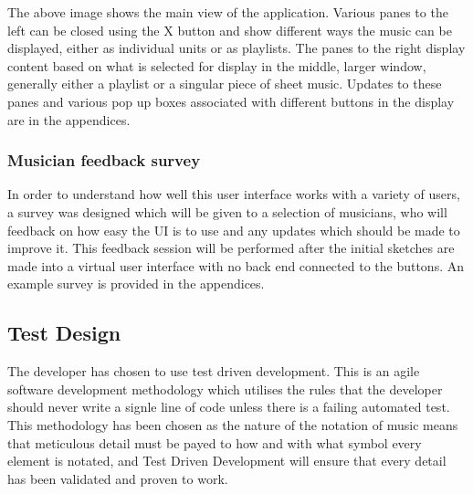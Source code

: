 \documentclass[bibtotocnumbered]{article}
\begin{document}
The above image shows the main view of the application. Various panes to the left can be closed using the X button and show different ways the music can be displayed, either as individual units or as playlists. The panes to the right display content based on what is selected for display in the middle, larger window, generally either a playlist or a singular piece of sheet music. Updates to these panes and various pop up boxes associated with different buttons in the display are in the appendices.
\subsubsection{Musician feedback survey}
In order to understand how well this user interface works with a variety of users, a survey was designed which will be given to a selection of musicians, who will feedback on how easy the UI is to use and any updates which should be made to improve it. This feedback session will be performed after the initial sketches are made into a virtual user interface with no back end connected to the buttons. An example survey is provided in the appendices.
\subsection{Test Design}
The developer has chosen to use test driven development. This is an agile software development methodology which utilises the rules that the developer should never write a signle line of code unless there is a failing automated test\parencite{TDD}. This methodology has been chosen as the nature of the notation of music means that meticulous detail must be payed to how and with what symbol every element is notated, and Test Driven Development will ensure that every detail has been validated and proven to work.
\end{document}
